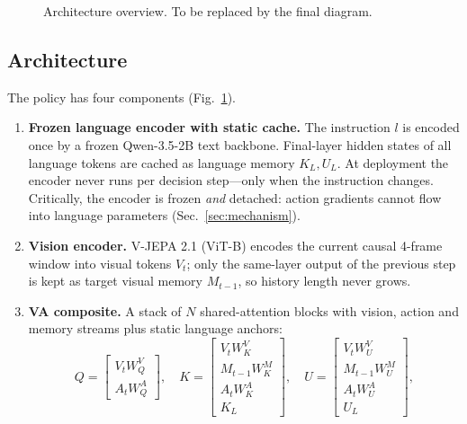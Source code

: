 \documentclass[10pt,twocolumn]{article}
\begin{document}
\begin{figure}[t]
\centering
{}
\caption{Architecture overview. To be replaced by the final diagram.}
\label{fig:arch}
\end{figure}

\subsection{Architecture}
\label{sec:arch}
The policy has four components (Fig.~\ref{fig:arch}).
\begin{enumerate}
\item \textbf{Frozen language encoder with static cache.} The instruction
$l$ is encoded once by a frozen Qwen-3.5-2B text backbone. Final-layer hidden
states of all language tokens are cached as language memory $K_L, U_L$. At
deployment the encoder never runs per decision step---only when the
instruction changes. Critically, the encoder is frozen \emph{and} detached:
action gradients cannot flow into language parameters (Sec.~\ref{sec:mechanism}).
\item \textbf{Vision encoder.} V-JEPA 2.1 (ViT-B) encodes the current causal
4-frame window into visual tokens $V_t$; only the same-layer output of the
previous step is kept as target visual memory $M_{t-1}$, so history length
never grows.
\item \textbf{VA composite.} A stack of $N$ shared-attention blocks with
vision, action and memory streams plus static language anchors:
\begin{equation}
Q=\begin{bmatrix}V_tW_Q^V\\A_tW_Q^A\end{bmatrix},\quad
K=\begin{bmatrix}V_tW_K^V\\M_{t-1}W_K^M\\A_tW_K^A\\K_L\end{bmatrix},\quad
U=\begin{bmatrix}V_tW_U^V\\M_{t-1}W_U^M\\A_tW_U^A\\U_L\end{bmatrix},
\end{equation}

\end{enumerate}
\end{document}
